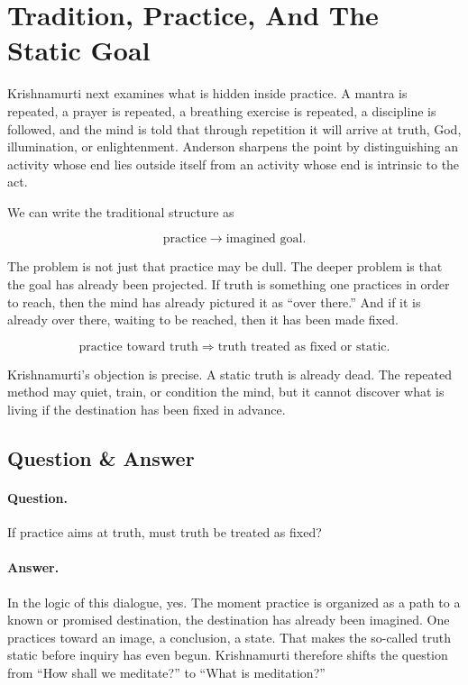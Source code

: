 \section{Tradition, Practice, And The Static Goal}

Krishnamurti next examines what is hidden inside practice. A mantra is repeated, a prayer is repeated, a breathing exercise is repeated, a discipline is followed, and the mind is told that through repetition it will arrive at truth, God, illumination, or enlightenment. Anderson sharpens the point by distinguishing an activity whose end lies outside itself from an activity whose end is intrinsic to the act.

We can write the traditional structure as

\begin{equation}
\text{practice}
\longrightarrow
\text{imagined goal}.
\end{equation}

The problem is not just that practice may be dull. The deeper problem is that the goal has already been projected. If truth is something one practices in order to reach, then the mind has already pictured it as ``over there.'' And if it is already over there, waiting to be reached, then it has been made fixed.

\begin{equation}
\text{practice toward truth}
\Rightarrow
\text{truth treated as fixed or static}.
\end{equation}

Krishnamurti's objection is precise. A static truth is already dead. The repeated method may quiet, train, or condition the mind, but it cannot discover what is living if the destination has been fixed in advance.

\subsection{Question \& Answer}

\paragraph{Question.}
If practice aims at truth, must truth be treated as fixed?

\paragraph{Answer.}
In the logic of this dialogue, yes. The moment practice is organized as a path to a known or promised destination, the destination has already been imagined. One practices toward an image, a conclusion, a state. That makes the so-called truth static before inquiry has even begun. Krishnamurti therefore shifts the question from ``How shall we meditate?'' to ``What is meditation?''

